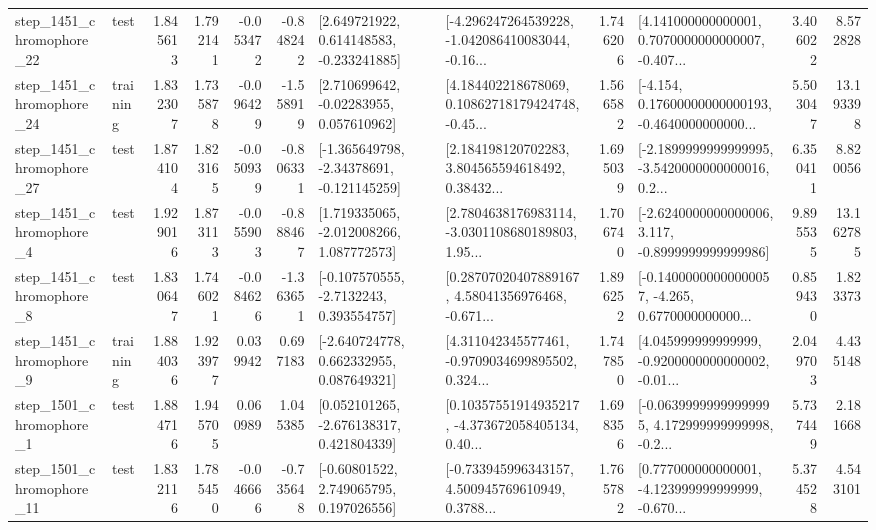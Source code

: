 \begin{tabular}{llrrrrllrlrr}
 step\_1451\_chromophore\_22 &      test &      1.845613 &    1.792141 &     -0.053472 & -0.848242 &    [2.649721922, 0.614148583, -0.233241885] &  [-4.296247264539228, -1.042086410083044, -0.16... &       1.746206 &  [4.141000000000001, 0.7070000000000007, -0.407... &            3.406022 &          8.572828 \\
 step\_1451\_chromophore\_24 &  training &      1.832307 &    1.735878 &     -0.096429 & -1.558919 &     [2.710699642, -0.02283955, 0.057610962] &  [4.184402218678069, 0.10862718179424748, -0.45... &       1.566582 &  [-4.154, 0.17600000000000193, -0.4640000000000... &            5.503047 &         13.193398 \\
 step\_1451\_chromophore\_27 &      test &      1.874104 &    1.823165 &     -0.050939 & -0.806331 &   [-1.365649798, -2.34378691, -0.121145259] &  [2.184198120702283, 3.804565594618492, 0.38432... &       1.695039 &  [-2.1899999999999995, -3.5420000000000016, 0.2... &            6.350411 &          8.820056 \\
  step\_1451\_chromophore\_4 &      test &      1.929016 &    1.873113 &     -0.055903 & -0.888467 &    [1.719335065, -2.012008266, 1.087772573] &  [2.7804638176983114, -3.0301108680189803, 1.95... &       1.706740 &  [-2.6240000000000006, 3.117, -0.8999999999999986] &            9.895535 &         13.162785 \\
  step\_1451\_chromophore\_8 &      test &      1.830647 &    1.746021 &     -0.084626 & -1.363651 &     [-0.107570555, -2.7132243, 0.393554757] &  [0.28707020407889167, 4.58041356976468, -0.671... &       1.896252 &  [-0.14000000000000057, -4.265, 0.6770000000000... &            0.859430 &          1.823373 \\
  step\_1451\_chromophore\_9 &  training &      1.884036 &    1.923977 &      0.039942 &  0.697183 &    [-2.640724778, 0.662332955, 0.087649321] &  [4.311042345577461, -0.9709034699895502, 0.324... &       1.747850 &  [4.045999999999999, -0.9200000000000002, -0.01... &            2.049703 &          4.435148 \\
  step\_1501\_chromophore\_1 &      test &      1.884716 &    1.945705 &      0.060989 &  1.045385 &    [0.052101265, -2.676138317, 0.421804339] &  [0.10357551914935217, -4.373672058405134, 0.40... &       1.698356 &  [-0.06399999999999995, 4.172999999999998, -0.2... &            5.737449 &          2.181668 \\
 step\_1501\_chromophore\_11 &      test &      1.832116 &    1.785450 &     -0.046666 & -0.735648 &     [-0.60801522, 2.749065795, 0.197026556] &  [-0.733945996343157, 4.500945769610949, 0.3788... &       1.765782 &  [0.777000000000001, -4.123999999999999, -0.670... &            5.374528 &          4.543101 \\

\end{tabular}
